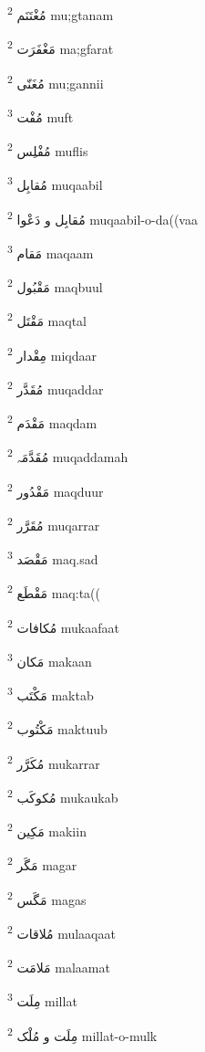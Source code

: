 \documentclass[12pt]{article}
\begin{document}
\begin{multicols}{5}
{\ur مُغْتَنَم}   \textsuperscript{2} mu;gtanam

{\ur مَغْفَرَت}   \textsuperscript{2} ma;gfarat

{\ur مُغَنّی}   \textsuperscript{2} mu;gannii

{\ur مُفْت}   \textsuperscript{3} muft

{\ur مُفْلِس}   \textsuperscript{2} muflis

{\ur مُقابِل}   \textsuperscript{3} muqaabil

{\ur مُقابِل و دَعْوا}   \textsuperscript{2} muqaabil-o-da((vaa

{\ur مَقام}   \textsuperscript{3} maqaam

{\ur مَقْبُول}   \textsuperscript{2} maqbuul

{\ur مَقْتَل}   \textsuperscript{2} maqtal

{\ur مِقْدار}   \textsuperscript{2} miqdaar

{\ur مُقَدَّر}   \textsuperscript{2} muqaddar

{\ur مَقْدَم}   \textsuperscript{2} maqdam

{\ur مُقَدَّمَہ}   \textsuperscript{2} muqaddamah

{\ur مَقْدُور}   \textsuperscript{2} maqduur

{\ur مُقَرَّر}   \textsuperscript{2} muqarrar

{\ur مَقْصَد}   \textsuperscript{3} maq.sad

{\ur مَقْطَع}   \textsuperscript{2} maq:ta((

{\ur مُکافات}   \textsuperscript{2} mukaafaat

{\ur مَکان}   \textsuperscript{3} makaan

{\ur مَکْتَب}   \textsuperscript{3} maktab

{\ur مَکْتُوب}   \textsuperscript{2} maktuub

{\ur مُکَرَّر}   \textsuperscript{2} mukarrar

{\ur مُکوکَب}   \textsuperscript{2} mukaukab

{\ur مَکِین}   \textsuperscript{2} makiin

{\ur مَگَر}   \textsuperscript{2} magar

{\ur مَگَس}   \textsuperscript{2} magas

{\ur مُلاقات}   \textsuperscript{2} mulaaqaat

{\ur مَلامَت}   \textsuperscript{2} malaamat

{\ur مِلَت}   \textsuperscript{3} millat

{\ur مِلَت و مُلْک}   \textsuperscript{2} millat-o-mulk


\end{multicols}
\end{document}
